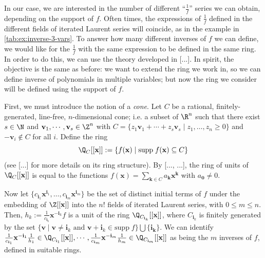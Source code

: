 \documentclass[11pt,e-only]{amsart}
\begin{document}
In our case, we are interested in the number of different ``$\frac{1}{f}$'' series we can obtain, depending on the support of $f$. Often times, the expressions of $\frac{1}{f}$ defined in the different fields of iterated Laurent series will coincide, as in the example in \cref{tab:ex:inverse-3-vars}. To answer how many different inverses of $f$ we can define, we would like for the $\frac{1}{f}$ with the same expression to be defined in the same ring. In order to do this, we can use the theory developed in [...]. In spirit, the objective is the same as before: we want to extend the ring we work in, so we can define inverse of polynomials in multiple variables; but now the ring we consider will be defined using the support of $f$.

First, we must introduce the notion of a \textit{cone}. Let $C$ be a rational, finitely-generated, line-free, $n$-dimensional cone; i.e. a subset of $\R^n$ such that there exist $s\in\N$ and $\mathbf{v}_1,\cdots,\mathbf{v}_s\in\Z^n$ with $C=\{z_1\mathbf{v}_1+\cdots+z_s\mathbf{v}_s \mid z_1,\dots,z_n \geq 0 \}$ and $-\mathbf{v}_i\notin C$ for all $i$. Define the ring \[\Q_C[[\mathbf{x}]]:=\{f(\mathbf{x}) \mid \textrm{supp}\;f(\mathbf{x})\subseteq C\}\] (see [...] for more details on its ring structure). By [..., ...], the ring of units of $\Q_C[[\mathbf{x}]]$ is equal to the functions $f(\mathbf{x})=\sum_{\mathbf{k}\in C} a_\mathbf{k}\mathbf{x}^\mathbf{k}$ with $a_\mathbf{0}\neq 0$.

Now let $\{c_{\mathbf{i}_1}\mathbf{x}^{\mathbf{i}_1},\dots,c_{\mathbf{i}_m}\mathbf{x}^{\mathbf{i}_m}\}$ be the set of distinct initial terms of $f$ under the embedding of $\Z[[\mathbf{x}]]$ into the $n!$ fields of iterated Laurent series, with $0\leq m\leq n$. Then, $h_k:=\frac{1}{c_{\mathbf{i}_k}}\mathbf{x}^{-\mathbf{i}_k}f$ is a unit of the ring $\Q_{C_{\mathbf{i}_k}}[[\mathbf{x}]]$, where $C_{\mathbf{i}_k}$ is finitely generated by the set $\{\mathbf{v}\mid \mathbf{v}\neq \mathbf{i}_k \text{ and } \mathbf{v}+\mathbf{i}_k\in\textrm{supp}\;f\}\bigcup \{\mathbf{i}_\mathbf{k}\}$. We can identify $\frac{1}{c_{\mathbf{i}_1}}\mathbf{x}^{-\mathbf{i}_1}\frac{1}{h_1}\in\Q_{C_{\mathbf{i}_1}}[[\mathbf{x}]],\cdots,\frac{1}{c_{\mathbf{i}_m}}\mathbf{x}^{-\mathbf{i}_m}\frac{1}{h_m}\in\Q_{C_{\mathbf{i}_m}}[[\mathbf{x}]]$ as being the $m$ inverses of $f$, defined in suitable rings.
\end{document}
